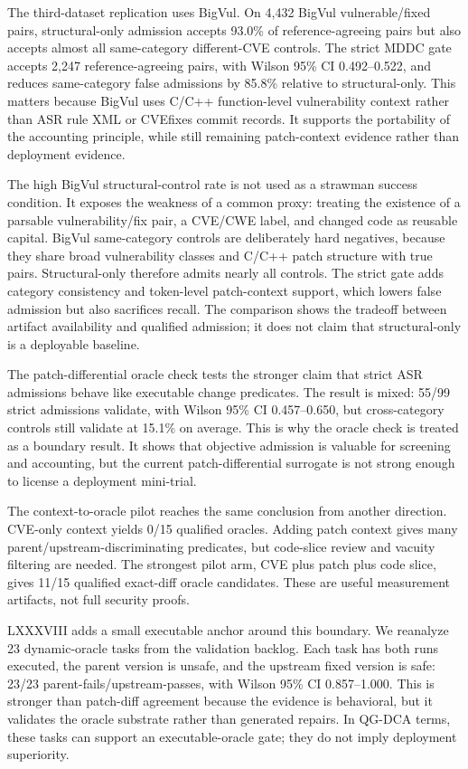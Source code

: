 ﻿\documentclass[lettersize,journal]{IEEEtran}
\begin{document}
The third-dataset replication uses BigVul. On 4,432 BigVul vulnerable/fixed pairs, structural-only admission accepts 93.0\% of reference-agreeing pairs but also accepts almost all same-category different-CVE controls. The strict MDDC gate accepts 2,247 reference-agreeing pairs, with Wilson 95\% CI 0.492--0.522, and reduces same-category false admissions by 85.8\% relative to structural-only. This matters because BigVul uses C/C++ function-level vulnerability context rather than ASR rule XML or CVEfixes commit records. It supports the portability of the accounting principle, while still remaining patch-context evidence rather than deployment evidence.

The high BigVul structural-control rate is not used as a strawman success condition. It exposes the weakness of a common proxy: treating the existence of a parsable vulnerability/fix pair, a CVE/CWE label, and changed code as reusable capital. BigVul same-category controls are deliberately hard negatives, because they share broad vulnerability classes and C/C++ patch structure with true pairs. Structural-only therefore admits nearly all controls. The strict gate adds category consistency and token-level patch-context support, which lowers false admission but also sacrifices recall. The comparison shows the tradeoff between artifact availability and qualified admission; it does not claim that structural-only is a deployable baseline.

The patch-differential oracle check tests the stronger claim that strict ASR admissions behave like executable change predicates. The result is mixed: 55/99 strict admissions validate, with Wilson 95\% CI 0.457--0.650, but cross-category controls still validate at 15.1\% on average. This is why the oracle check is treated as a boundary result. It shows that objective admission is valuable for screening and accounting, but the current patch-differential surrogate is not strong enough to license a deployment mini-trial.

The context-to-oracle pilot reaches the same conclusion from another direction. CVE-only context yields 0/15 qualified oracles. Adding patch context gives many parent/upstream-discriminating predicates, but code-slice review and vacuity filtering are needed. The strongest pilot arm, CVE plus patch plus code slice, gives 11/15 qualified exact-diff oracle candidates. These are useful measurement artifacts, not full security proofs.

LXXXVIII adds a small executable anchor around this boundary. We reanalyze 23 dynamic-oracle tasks from the validation backlog. Each task has both runs executed, the parent version is unsafe, and the upstream fixed version is safe: 23/23 parent-fails/upstream-passes, with Wilson 95\% CI 0.857--1.000. This is stronger than patch-diff agreement because the evidence is behavioral, but it validates the oracle substrate rather than generated repairs. In QG-DCA terms, these tasks can support an executable-oracle gate; they do not imply deployment superiority.
\end{document}
